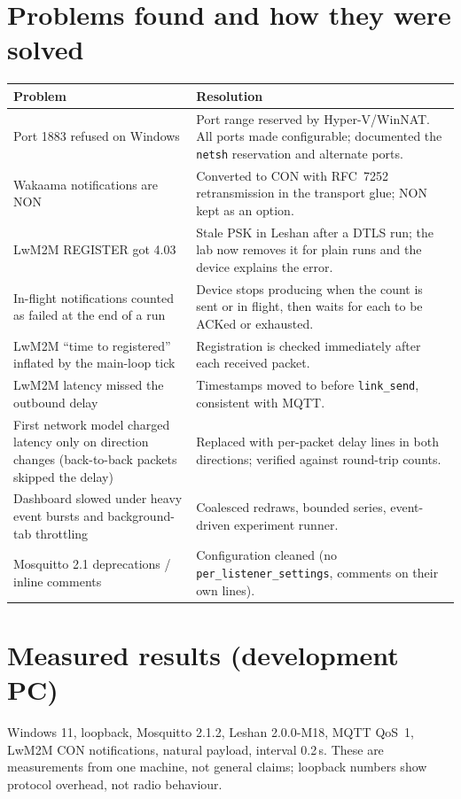 \documentclass[11pt,a4paper]{article}
\newcommand{\code}[1]{\texttt{#1}}
\begin{document}
\section{Problems found and how they were solved}
\begin{longtable}{@{}p{4.6cm}p{10cm}@{}}
\toprule
Problem & Resolution \\
\midrule
\endhead
Port 1883 refused on Windows & Port range reserved by Hyper-V/WinNAT. All ports made configurable; documented the \code{netsh} reservation and alternate ports. \\
Wakaama notifications are NON & Converted to CON with RFC~7252 retransmission in the transport glue; NON kept as an option. \\
LwM2M REGISTER got 4.03 & Stale PSK in Leshan after a DTLS run; the lab now removes it for plain runs and the device explains the error. \\
In-flight notifications counted as failed at the end of a run & Device stops producing when the count is sent or in flight, then waits for each to be ACKed or exhausted. \\
LwM2M ``time to registered'' inflated by the main-loop tick & Registration is checked immediately after each received packet. \\
LwM2M latency missed the outbound delay & Timestamps moved to before \code{link\_send}, consistent with MQTT. \\
First network model charged latency only on direction changes (back-to-back packets skipped the delay) & Replaced with per-packet delay lines in both directions; verified against round-trip counts. \\
Dashboard slowed under heavy event bursts and background-tab throttling & Coalesced redraws, bounded series, event-driven experiment runner. \\
Mosquitto 2.1 deprecations / inline comments & Configuration cleaned (no \code{per\_listener\_settings}, comments on their own lines). \\
\bottomrule
\end{longtable}

\section{Measured results (development PC)}
Windows 11, loopback, Mosquitto 2.1.2, Leshan 2.0.0-M18, MQTT QoS~1, LwM2M CON
notifications, natural payload, interval 0.2\,s. These are measurements from one
machine, not general claims; loopback numbers show protocol overhead, not radio
behaviour.
\end{document}
